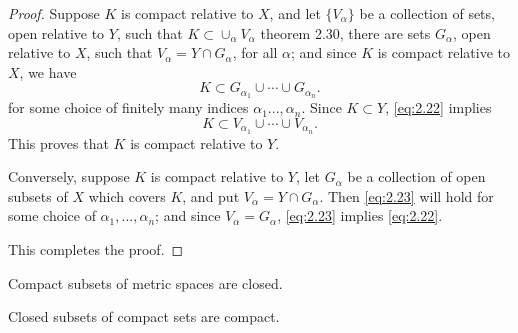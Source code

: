 \begin{proof}
    Suppose $K$ is compact relative to $X$, and let $\{V_\alpha\}$ be a collection of sets, open relative to $Y$, such that $K \subset \cup_\alpha V_\alpha$ theorem 2.30, there are sets $G_\alpha$, open relative to $X$, such that $V_\alpha = Y \cap G_\alpha$, for all $\alpha$; and since $K$ is compact relative to $X$, we have
    \begin{equation}\label{eq:2.22}
        K \subset G_{\alpha_{1}} \cup \cdots \cup G_{\alpha_{n}}.
    \end{equation}
    for some choice of finitely many indices $\alpha_1 ..., \alpha_n$. Since $K \subset Y$, \ref{eq:2.22} implies
    \begin{equation}\label{eq:2.23}
        K \subset V_{\alpha_{1}} \cup \cdots \cup V_{\alpha_{n}}.
    \end{equation}
    This proves that $K$ is compact relative to $Y$.
    
    Conversely, suppose $K$ is compact relative to $Y$, let $G_\alpha$ be a collection of open subsets of $X$ which covers $K$, and put $V_\alpha = Y \cap G_\alpha$. Then \ref{eq:2.23} will hold for some choice of $\alpha_1, ...,\alpha_n$; and since $V_\alpha = G_\alpha$, \ref{eq:2.23} implies \ref{eq:2.22}.
    
    This completes the proof.
\end{proof}

\begin{thm}
    \label{thm:2.34}
    Compact subsets of metric spaces are closed.
\end{thm}





\begin{thm}\label{thm:2.35 compact-close}
    Closed subsets of compact sets are compact.
\end{thm}

